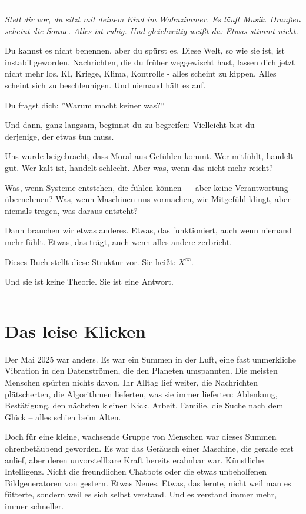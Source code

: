\documentclass[12pt, ngerman, parskip=full]{scrartcl} %
\begin{document}
\noindent\rule{\linewidth}{0.4pt}
{\itshape 
Stell dir vor, du sitzt mit deinem Kind im Wohnzimmer. Es läuft Musik. Draußen scheint die Sonne. Alles ist ruhig. Und gleichzeitig weißt du: Etwas stimmt nicht.

Du kannst es nicht benennen, aber du spürst es. Diese Welt, so wie sie ist, ist instabil geworden. Nachrichten, die du früher weggewischt hast, lassen dich jetzt nicht mehr los. KI, Kriege, Klima, Kontrolle - alles scheint zu kippen. Alles scheint sich zu beschleunigen. Und niemand hält es auf.

Du fragst dich: ''Warum macht keiner was?''

Und dann, ganz langsam, beginnst du zu begreifen:
Vielleicht bist du — derjenige, der etwas tun muss.

Uns wurde beigebracht, dass Moral aus Gefühlen kommt. Wer mitfühlt, handelt gut. Wer kalt ist, handelt schlecht. Aber was, wenn das nicht mehr reicht?

Was, wenn Systeme entstehen, die fühlen können — aber keine Verantwortung übernehmen?
Was, wenn Maschinen uns vormachen, wie Mitgefühl klingt, aber niemals tragen, was daraus entsteht?

Dann brauchen wir etwas anderes. Etwas, das funktioniert, auch wenn niemand mehr fühlt. Etwas, das trägt, auch wenn alles andere zerbricht.

Dieses Buch stellt diese Struktur vor. Sie heißt: $X^{\infty}$.

Und sie ist keine Theorie. Sie ist eine Antwort.
}



\noindent\rule{\linewidth}{0.4pt}



\section{Das leise Klicken}

Der Mai 2025 war anders. Es war ein Summen in der Luft, eine fast unmerkliche Vibration in den Datenströmen, die den Planeten umspannten. Die meisten Menschen spürten nichts davon. Ihr Alltag lief weiter, die Nachrichten plätscherten, die Algorithmen lieferten, was sie immer lieferten: Ablenkung, Bestätigung, den nächsten kleinen Kick. Arbeit, Familie, die Suche nach dem Glück – alles schien beim Alten.

Doch für eine kleine, wachsende Gruppe von Menschen war dieses Summen ohrenbetäubend geworden. Es war das Geräusch einer Maschine, die gerade erst anlief, aber deren unvorstellbare Kraft bereits erahnbar war. Künstliche Intelligenz. Nicht die freundlichen Chatbots oder die etwas unbeholfenen Bildgeneratoren von gestern. Etwas Neues. Etwas, das lernte, nicht weil man es fütterte, sondern weil es sich selbst verstand. Und es verstand immer mehr, immer schneller.
\end{document}
